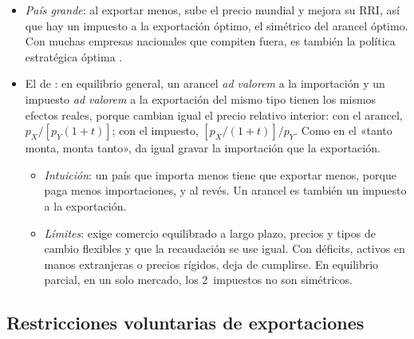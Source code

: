 \documentclass[11pt]{article}
\begin{document}
\begin{itemize}
\item \emph{País grande}: al exportar menos, sube el precio mundial y mejora su RRI, así que hay un impuesto a la exportación óptimo, el simétrico del arancel óptimo. Con muchas empresas nacionales que compiten fuera, es también la política estratégica óptima .
\item El  de \textcite{Lerner1936Symmetry}: en equilibrio general, un arancel \emph{ad valorem} a la importación y un impuesto \emph{ad valorem} a la exportación del mismo tipo tienen los mismos efectos reales, porque cambian igual el precio relativo interior: con el arancel, $p_X/[p_Y(1+t)]$; con el impuesto, $[p_X/(1+t)]/p_Y$. Como en el «tanto monta, monta tanto», da igual gravar la importación que la exportación.
  \begin{itemize}
  \item \emph{Intuición}: un país que importa menos tiene que exportar menos, porque paga menos importaciones, y al revés. Un arancel es también un impuesto a la exportación.
  \item \emph{Límites}: exige comercio equilibrado a largo plazo, precios y tipos de cambio flexibles y que la recaudación se use igual. Con déficits, activos en manos extranjeras o precios rígidos, deja de cumplirse\nocite{CostinotWerning2017Lerner}. En equilibrio parcial, en un solo mercado, los 2~impuestos no son simétricos.
  \end{itemize}
\end{itemize}

\subsection{Restricciones voluntarias de exportaciones}\label{sec:rve}
\end{document}
